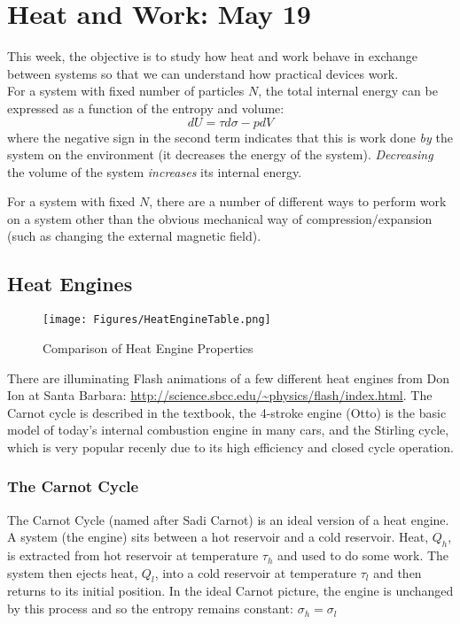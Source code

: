 \section{Heat and Work: May 19}
\label{s:HeatWork}
This week, the objective is to study how heat and work behave in exchange between systems so that we can understand how practical devices work.\\

For a system with fixed number of particles $N$, the total internal energy can be expressed as a function of the entropy and volume:
\begin{equation}
dU = \tau d\sigma - p dV
\end{equation}
where the negative sign in the second term indicates that this is work done \textit{by} the system on the environment (it decreases the energy of the system). \emph{Decreasing} the volume of the system \emph{increases} its internal energy.

For a system with fixed $N$, there are a number of different ways to perform work on a system other than the obvious mechanical way of compression/expansion (such as changing the external magnetic field).

\subsection{Heat Engines}
\begin{figure}[h]
\centering
\texttt{[image: Figures/HeatEngineTable.png]}
\caption{Comparison of Heat Engine Properties}
\end{figure}

There are illuminating Flash animations of a few different heat engines from Don Ion at Santa Barbara:
\url{http://science.sbcc.edu/~physics/flash/index.html}. The Carnot cycle is described in the textbook,
the 4-stroke engine (Otto) is the basic model of today's internal combustion engine in many cars, and
the Stirling cycle, which is very popular recenly due to its high efficiency and closed cycle operation.

\subsubsection{The Carnot Cycle}
The Carnot Cycle (named after Sadi Carnot) is an ideal version of a heat engine. A system (the engine) sits between a hot reservoir and a cold reservoir. Heat, $Q_h$, is extracted from hot reservoir at temperature $\tau_h$ and used to do some work. The system then ejects heat, $Q_l$, into a cold reservoir at temperature $\tau_l$ and then returns to its initial position. In the ideal Carnot picture, the engine is unchanged by this process and so the entropy remains constant: $\sigma_h = \sigma_l$

